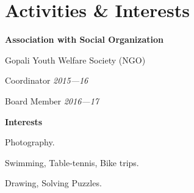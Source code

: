 \section{Activities \& Interests}
		\textbf{Association with Social Organization}
		\begin{innerlist}
		\item  Gopali Youth Welfare Society (NGO)
		    \begin{innerlist}
			\item Coordinator \hfill \textit{2015---16}
			\item Board Member \hfill \textit{2016---17}
			\end{innerlist}
		\end{innerlist}

		\textbf{Interests}
		\begin{innerlist}
			\item Photography.
			\item Swimming, Table-tennis, Bike trips. 
			\item Drawing, Solving Puzzles.
		\end{innerlist}